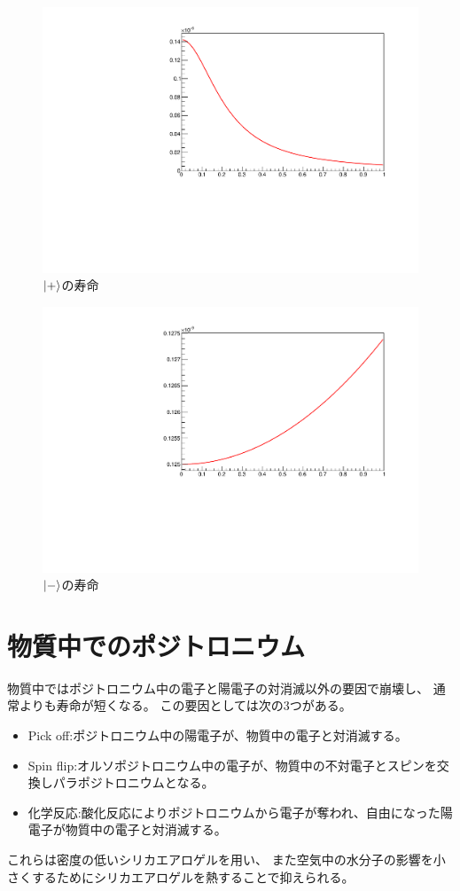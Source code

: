 \begin{figure}[H]
\centering
\includegraphics[keepaspectratio,angle=270,scale=0.6]{fig/ybm/pluslife.pdf}
\caption{$\ket{+}$の寿命}
\label{fig:pluslife}
\end{figure}

\begin{figure}[H]
\centering
\includegraphics[keepaspectratio,angle=270,scale=0.6]{fig/ybm/minuslife.pdf}
\caption{$\ket{-}$の寿命}
\label{fig:minuslife}
\end{figure}


\section{物質中でのポジトロニウム}

物質中ではポジトロニウム中の電子と陽電子の対消滅以外の要因で崩壊し、
通常よりも寿命が短くなる。
この要因としては次の3つがある。
\begin{itemize}
\item Pick off:ポジトロニウム中の陽電子が、物質中の電子と対消滅する。
\item Spin flip:オルソポジトロニウム中の電子が、物質中の不対電子とスピンを交換しパラポジトロニウムとなる。
\item 化学反応:酸化反応によりポジトロニウムから電子が奪われ、自由になった陽電子が物質中の電子と対消滅する。
\end{itemize}
これらは密度の低いシリカエアロゲルを用い、
また空気中の水分子の影響を小さくするためにシリカエアロゲルを熱することで抑えられる。


